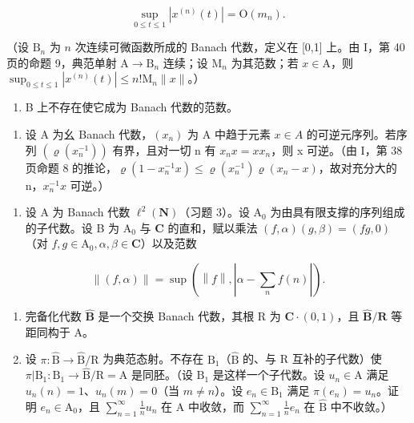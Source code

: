 \[
\sup _ {0 \leqslant t \leqslant 1} | x ^ {(n)} (t) | = \mathrm{O} (m _ {n}).
\]

（设 \(\mathrm{B}_n\) 为 \(n\) 次连续可微函数所成的 Banach 代数，定义在 {[}0,1{]} 上。由 I，第 40 页的命题 9，典范单射 \(\mathrm{A} \to \mathrm{B}_n\) 连续；设 \(\mathrm{M}_n\) 为其范数；若 \(x \in \mathrm{A}\)，则 \(\sup_{0 \leq t \leq 1} |x^{(n)}(t)| \leqslant n!\mathrm{M}_n \| x\|\)。）

\begin{enumerate}
\def\labelenumi{\alph{enumi})}
\setcounter{enumi}{1}
\tightlist
\item
  B 上不存在使它成为 Banach 代数的范数。
\end{enumerate}

\begin{enumerate}
\def\labelenumi{\arabic{enumi})}
\setcounter{enumi}{11}
\tightlist
\item
  设 A 为幺 Banach 代数，\((x_{n})\) 为 A 中趋于元素 \(x \in A\) 的可逆元序列。若序列 \((\varrho(x_{n}^{-1}))\) 有界，且对一切 n 有 \(x_{n}x = xx_{n}\)，则 x 可逆。（由 I，第 38 页命题 8 的推论，\(\varrho(1 - x_{n}^{-1}x) \leqslant \varrho(x_{n}^{-1})\varrho(x_{n} - x)\)，故对充分大的 n，\(x_{n}^{-1}x\) 可逆。）
\end{enumerate}

\begin{enumerate}
\def\labelenumi{¶ \arabic{enumi})}
\setcounter{enumi}{12}
\tightlist
\item
  设 A 为 Banach 代数 \(\ell^{2}(\mathbf{N})\)（习题 3）。设 \(\mathrm{A}_{0}\) 为由具有限支撑的序列组成的子代数。设 B 为 \(\mathrm{A}_{0}\) 与 \(\mathbf{C}\) 的直和，赋以乘法 \((f,\alpha)(g,\beta)=(fg,0)\)（对 \(f,g\in\mathrm{A}_{0},\alpha,\beta\in\mathbf{C}\)）以及范数
\end{enumerate}

\[
\left\| (f, \alpha) \right\| = \sup \left(\left\| f \right\|, \left| \alpha - \sum_ {n} f (n) \right|\right).
\]

\begin{enumerate}
\def\labelenumi{\alph{enumi})}
\item
  完备化代数 \(\widehat{\mathbf{B}}\) 是一个交换 Banach 代数，其根 R 为 \(\mathbf{C} \cdot (0,1)\)，且 \(\widehat{\mathbf{B}}/\mathbf{R}\) 等距同构于 A。
\item
  设 \(\pi\colon\widehat{\mathrm{B}}\to\widehat{\mathrm{B}}/\mathrm{R}\) 为典范态射。不存在 \(\mathrm{B}_{1}\)（\(\widehat{\mathrm{B}}\) 的、与 R 互补的子代数）使 \(\pi|\mathrm{B}_{1}\colon\mathrm{B}_{1}\to\widehat{\mathrm{B}}/\mathrm{R}=\mathrm{A}\) 是同胚。（设 \(\mathrm{B}_{1}\) 是这样一个子代数。设 \(u_{n}\in\mathrm{A}\) 满足 \(u_{n}(n)=1\)、\(u_{n}(m)=0\)（当 \(m\neq n\)）。设 \(e_{n}\in\mathrm{B}_{1}\) 满足 \(\pi(e_{n})=u_{n}\)。证明 \(e_{n}\in\mathrm{A}_{0}\)，且 \(\sum_{n=1}^{\infty}\frac{1}{n}u_{n}\) 在 A 中收敛，而 \(\sum_{n=1}^{\infty}\frac{1}{n}e_{n}\) 在 \(\widehat{\mathrm{B}}\) 中不收敛。）
\end{enumerate}


